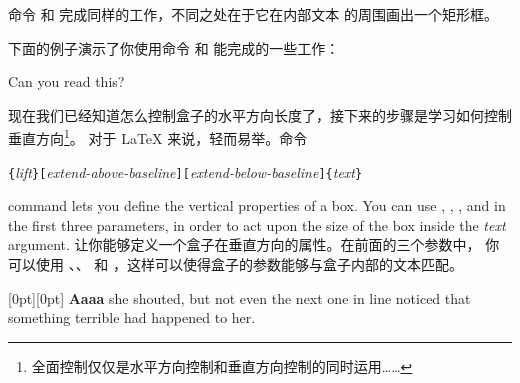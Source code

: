 命令  和  完成同样的工作，不同之处在于它在内部文本
的周围画出一个矩形框。

下面的例子演示了你使用命令  和  能完成的一些工作：

\begin{example}
\par
{}\par
{} \par
{} \par
{}
Can you read this?
\end{example}

现在我们已经知道怎么控制盒子的水平方向长度了，接下来的步骤是学习如何控制
垂直方向\footnote{全面控制仅仅是水平方向控制和垂直方向控制的同时运用……}。
对于 \LaTeX{} 来说，轻而易举。命令

\begin{lscommand}
\verb|{|\emph{lift}\verb|}[|\emph{extend-above-baseline}\verb|][|\emph{extend-below-baseline}\verb|]{|\emph{text}\verb|}|
\end{lscommand}

\noindent command lets you define the vertical properties of a
box. You can use , , , and
   in the first three parameters, in order to act
  upon the size of the box inside the \emph{text} argument.
\noindent 让你能够定义一个盒子在垂直方向的属性。在前面的三个参数中，
你可以使用 、、 
和 ，这样可以使得盒子的参数能够与盒子内部的文本匹配。

\begin{example}
	\raisebox{0pt}[0pt][0pt]{\Large%
		\textbf{Aaaa\raisebox{-0.3ex}{a}%
			\raisebox{-0.7ex}{aa}%
			\raisebox{-1.2ex}{r}%
			\raisebox{-2.2ex}{g}%
			\raisebox{-4.5ex}{h}}}
	she shouted, but not even the next
	one in line noticed that something
	terrible had happened to her.
\end{example}


